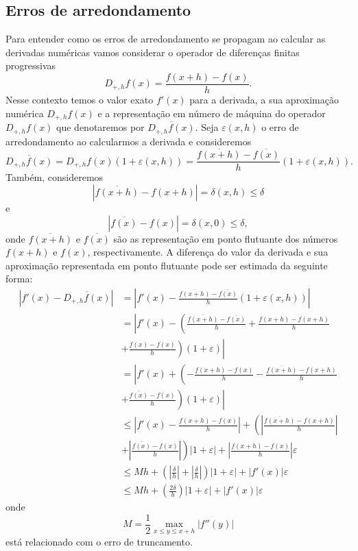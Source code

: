 \subsection{Erros de arredondamento}
Para entender como os erros de arredondamento se propagam ao calcular as derivadas numéricas vamos considerar o operador de diferenças finitas progressivas
$$
D_{+,h}f(x) =\frac{f(x+h)-f(x)}{h}.
$$
Nesse contexto temos o valor exato $f'(x)$ para a derivada, a sua aproximação numérica $D_{+,h}f(x)$ e a representação em número de máquina do operador $D_{+,h}f(x)$ que denotaremos por $\overline{D_{+,h}f(x)}$. Seja $\varepsilon(x,h)$ o erro de arredondamento ao calcularmos a derivada e consideremos
$$
\overline{D_{+,h}f(x)}=D_{+,h}f(x)(1+\varepsilon(x,h))=\frac{\overline{f(x+h)}-\overline{f(x)}}{h}(1+\varepsilon(x,h)).
$$
Também, consideremos
$$
|\overline{f(x+h)}-f(x+h)|=\delta(x,h)\leq \delta
$$
e
$$
|\overline{f(x)}-f(x)|=\delta(x,0)\leq \delta,
$$
onde $\overline{f(x+h)}$ e $\overline{f(x)}$ são as representação em ponto flutuante dos números $f(x+h)$ e $f(x)$, respectivamente. A diferença do valor da derivada e sua aproximação representada em ponto flutuante pode ser estimada da seguinte forma:
\begin{align*}
\left|f'(x)-\overline{D_{+,h}f(x)}\right|&= \left| f'(x)-\frac{\overline{f(x+h)}-\overline{f(x)}}{h}(1+\varepsilon(x,h)) \right|\\
&= \left| f'(x)-\left(\frac{\overline{f(x+h)}-\overline{f(x)}}{h}+\frac{f(x+h)-f(x+h)}{h}\right.\right. \\
&+ \left.\left.\frac{f(x)-f(x)}{h}\right)(1+\varepsilon) \right|\\
&= \left| f'(x)+\left(-\frac{f(x+h)-f(x)}{h}-\frac{\overline{f(x+h)}-f(x+h)}{h}\right.\right.\\
&+ \left.\left. \frac{\overline{f(x)}-f(x)}{h}\right)(1+\varepsilon) \right|\\
&\leq \left|f'(x)-\frac{f(x+h)-f(x)}{h}\right| +\left(\left|\frac{\overline{f(x+h)}-f(x+h)}{h}\right|\right.\\
&+\left.\left|\frac{\overline{f(x)}-f(x)}{h}\right| \right)|1+\varepsilon| + \left|\frac{f(x+h)-f(x)}{h}\right|\varepsilon\\
&\leq Mh +\left(\left|\frac{\delta}{h}\right|+\left|\frac{\delta}{h}\right| \right)|1+\varepsilon| +|f'(x)|\varepsilon\\
&\leq Mh +\left(\frac{2\delta}{h}\right)|1+\varepsilon| +|f'(x)|\varepsilon
\end{align*}
onde
$$
M=\frac{1}{2}\max_{x\leq y\leq x+h}|f''(y)|
$$
está relacionado com o erro de truncamento.

